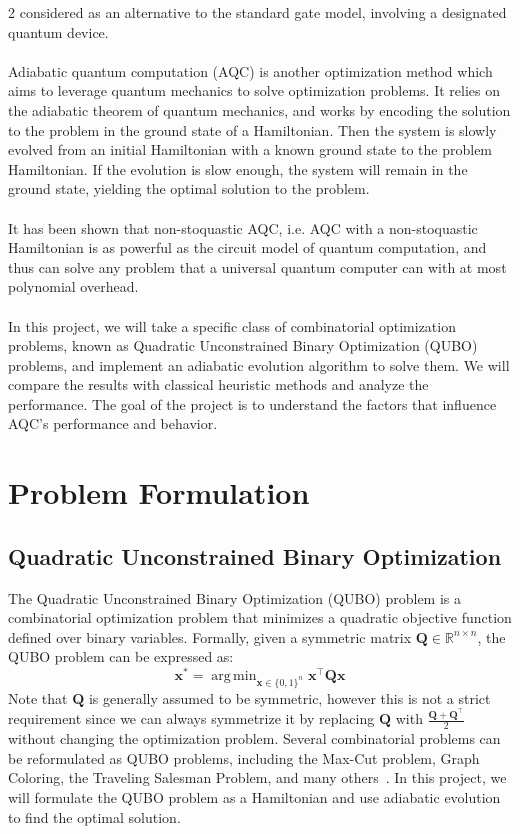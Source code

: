 \documentclass[10pt]{article}
\DeclareMathOperator*{\argmin}{arg\,min}
\begin{document}
\begin{multicols*}{2}
considered as an alternative to the standard gate model, involving a designated quantum device\cite{QuantumAnnealingDisordered}. \\\\
Adiabatic quantum computation (AQC) is another optimization method which aims to leverage quantum mechanics to solve optimization problems. It relies on the adiabatic theorem of quantum mechanics, and works by encoding the solution to the problem in the ground state of a Hamiltonian. Then the system is slowly evolved from an initial Hamiltonian with a known ground state to the problem Hamiltonian. If the evolution is slow enough, the system will remain in the ground state, yielding the optimal solution to the problem. \\\\ 
It has been shown that non-stoquastic AQC, i.e. AQC with a non-stoquastic Hamiltonian is as powerful as the 
circuit model of quantum computation, and thus can solve any problem that a universal quantum computer can with at most polynomial overhead\cite{AdiabaticQuantumComputation}.  \\\\
In this project, we will take a specific class of combinatorial optimization problems,
known as Quadratic Unconstrained Binary Optimization (QUBO) problems, and implement 
an adiabatic evolution algorithm to solve them. We will compare the results with classical heuristic 
methods and analyze the performance. The goal of the project is to understand the factors
that influence AQC's performance and behavior.
\section{Problem Formulation}
\subsection{Quadratic Unconstrained Binary Optimization}
The Quadratic Unconstrained Binary Optimization (QUBO) problem is a combinatorial optimization 
problem that minimizes a quadratic objective function defined over binary variables. 
Formally, given a symmetric matrix $\mathbf{Q} \in \mathbb{R}^{n \times n}$,
the QUBO problem can be expressed as:
$$\mathbf{x}^* = \argmin_{\mathbf{x} \in \{0,1\}^n} \mathbf{x}^\top \mathbf{Q} \mathbf{x}$$
Note that $\mathbf{Q}$ is generally assumed to be symmetric, however this is not a strict requirement since we can always symmetrize it by replacing $\mathbf{Q}$ with $\frac{\mathbf{Q} + \mathbf{Q}^\top}{2}$ without changing the optimization problem.
Several combinatorial problems can be reformulated as QUBO problems, including the Max-Cut problem,
Graph Coloring, the Traveling Salesman Problem, and many others~\cite{gloverTutorialFormulatingUsing2019}.
In this project, we will formulate the QUBO problem as a Hamiltonian and use adiabatic evolution to 
find the optimal solution. 

\end{multicols*}
\end{document}
